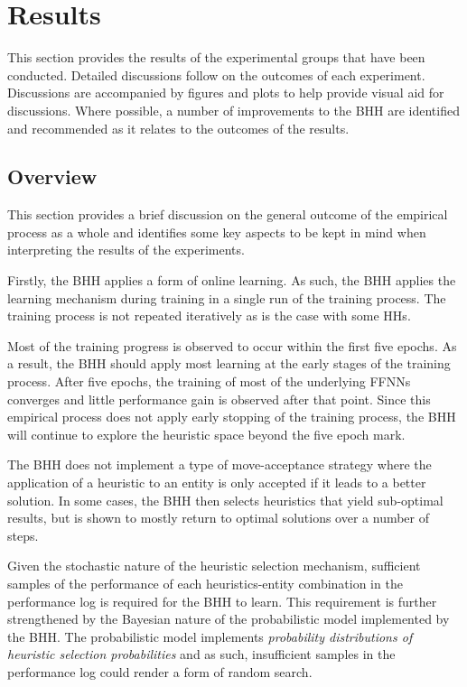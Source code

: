 \section{Results}
\label{sec:results}

This section provides the results of the experimental groups that have been conducted. Detailed discussions follow on the outcomes of each experiment. Discussions are accompanied by figures and plots to help provide visual aid for discussions. Where possible, a number of improvements to the \acs{BHH} are identified and recommended as it relates to the outcomes of the results.

\subsection{Overview}\label{sec:results:overview}

This section provides a brief discussion on the general outcome of the empirical process as a whole and identifies some key aspects to be kept in mind when interpreting the results of the experiments.

Firstly, the \acs{BHH} applies a form of online learning. As such, the \acs{BHH} applies the learning mechanism during training in a single run of the training process. The training process is not repeated iteratively as is the case with some \acp{HH}.

Most of the training progress is observed to occur within the first five epochs. As a result, the \acs{BHH} should apply most learning at the early stages of the training process. After five epochs, the training of most of the underlying \acp{FFNN} converges and little performance gain is observed after that point. Since this empirical process does not apply early stopping of the training process, the \acs{BHH} will continue to explore the heuristic space beyond the five epoch mark.

The \acs{BHH} does not implement a type of move-acceptance strategy where the application of a heuristic to an entity is only accepted if it leads to a better solution. In some cases, the \acs{BHH} then selects heuristics that yield sub-optimal results, but is shown to mostly return to optimal solutions over a number of steps.

Given the stochastic nature of the heuristic selection mechanism, sufficient samples of the performance of each heuristics-entity combination in the performance log is required for the \acs{BHH} to learn. This requirement is further strengthened by the Bayesian nature of the probabilistic model implemented by the \acs{BHH}. The probabilistic model implements \textit{probability distributions of heuristic selection probabilities} and as such, insufficient samples in the performance log could render a form of random search.

